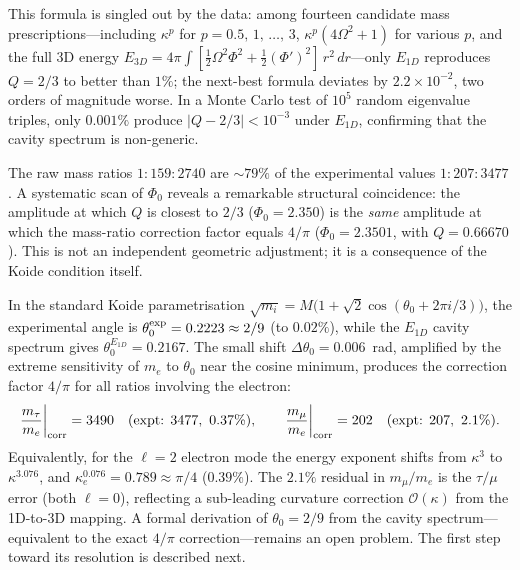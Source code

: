 \documentclass[aps,prd,onecolumn,superscriptaddress,nofootinbib,showpacs,12pt,notitlepage]{revtex4-2}
\begin{document}
This formula is singled out by the data: among fourteen
candidate mass prescriptions---including
$\kappa^p$ for $p = 0.5,\,1,\,\ldots,\,3$,
$\kappa^p(4\Omega^2 + 1)$ for various $p$,
and the full 3D energy
$E_{3D} = 4\pi\!\int[\tfrac{1}{2}\Omega^2\Phi^2
+ \tfrac{1}{2}(\Phi')^2]\,r^2\,dr$---only
$E_{1D}$ reproduces $Q = 2/3$ to better than $1\%$;
the next-best formula deviates by $2.2 \times 10^{-2}$,
two orders of magnitude worse.  In a Monte Carlo test of
$10^5$ random eigenvalue triples, only $0.001\%$ produce
$|Q - 2/3| < 10^{-3}$ under $E_{1D}$, confirming that
the cavity spectrum is non-generic.

The raw mass ratios $1 : 159 : 2740$ are $\sim\!79\%$ of
the experimental values $1 : 207 : 3477$.  A systematic
scan of $\Phi_0$ reveals a remarkable structural coincidence:
the amplitude at which $Q$ is closest to $2/3$ ($\Phi_0 = 2.350$)
is the \emph{same} amplitude at which the mass-ratio correction
factor equals $4/\pi$ ($\Phi_0 = 2.3501$, with $Q = 0.66670$).
This is not an independent geometric adjustment; it is a
consequence of the Koide condition itself.

In the standard Koide parametrisation
$\sqrt{m_i} = M\bigl(1 + \sqrt{2}\cos(\theta_0 + 2\pi i/3)\bigr)$,
the experimental angle is $\theta_0^{\rm exp} = 0.2223 \approx 2/9$
(to $0.02\%$), while the $E_{1D}$ cavity spectrum gives
$\theta_0^{E_{1D}} = 0.2167$.  The small shift
$\Delta\theta_0 = 0.006$~rad, amplified by the extreme
sensitivity of $m_e$ to $\theta_0$ near the cosine
minimum, produces the correction factor $4/\pi$ for all
ratios involving the electron:
\begin{equation}
  \frac{m_\tau}{m_e}\bigg|_{\rm corr} = 3490
  \quad(\text{expt: } 3477,\ 0.37\%),
  \qquad
  \frac{m_\mu}{m_e}\bigg|_{\rm corr} = 202
  \quad(\text{expt: } 207,\ 2.1\%).
\end{equation}
Equivalently, for the $\ell = 2$ electron mode the energy
exponent shifts from $\kappa^3$ to $\kappa^{3.076}$,
and $\kappa_e^{0.076} = 0.789 \approx \pi/4$ ($0.39\%$).
The $2.1\%$ residual in $m_\mu/m_e$ is the $\tau/\mu$ error
(both $\ell = 0$), reflecting a sub-leading curvature correction
$\mathcal{O}(\kappa)$ from the 1D-to-3D mapping.
A formal derivation of $\theta_0 = 2/9$ from the cavity
spectrum---equivalent to the exact $4/\pi$ correction---remains
an open problem.  The first step toward its resolution is
described next.
\end{document}
